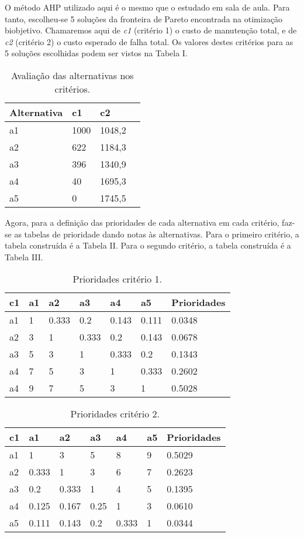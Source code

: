 O método AHP utilizado aqui é o mesmo que o estudado em sala de aula. Para tanto, escolheu-se 5 soluções da fronteira de Pareto encontrada na otimização biobjetivo. Chamaremos aqui de \textit{c1} (critério 1) o custo de manutenção total, e de \textit{c2} (critério 2) o custo esperado de falha total. Os valores destes critérios para as 5 soluções escolhidas podem ser vistos na Tabela I.
\begin{table}[h]
	\centering
	\begin{tabular}{ | l | l | l | l |}
		\hline
		Alternativa & c1 & c2 \\ \hline
		a1 & 1000 & 1048,2 \\ \hline
		a2 & 622 & 1184,3 \\ \hline
		a3 & 396 & 1340,9 \\ \hline
		a4 & 40 & 1695,3 \\ \hline
		a5 & 0 & 1745,5 \\ \hline
	\end{tabular}
	\label{table:c-ahp}
	\caption{Avaliação das alternativas nos critérios.}
\end{table}

Agora, para a definição das prioridades de cada alternativa em cada critério, faz-se as tabelas de prioridade dando notas às alternativas. Para o primeiro critério, a tabela construída é a Tabela II. Para o segundo critério, a tabela construída é a Tabela III.
\begin{table}[h]
	\centering
	\begin{tabular}{ | l | l | l | l | l | l | l | }
		\hline
		c1 & a1 & a2 & a3 & a4 & a5 & Prioridades \\ \hline
		a1 & 1 & 0.333 & 0.2 & 0.143 & 0.111 & 0.0348 \\ \hline
		a2 & 3 & 1 & 0.333 & 0.2 & 0.143 & 0.0678 \\ \hline
		a3 & 5 & 3 & 1 & 0.333 & 0.2 & 0.1343 \\ \hline
		a4 & 7 & 5 & 3 & 1 & 0.333 & 0.2602 \\ \hline
		a4 & 9 & 7 & 5 & 3 & 1 & 0.5028 \\ \hline
	\end{tabular}
	\label{table:c1}
	\caption{Prioridades critério 1.}
\end{table}

\begin{table}[h]
	\centering
	\begin{tabular}{ | l | l | l | l | l | l | l | }
		\hline
		c1 & a1 & a2 & a3 & a4 & a5 & Prioridades \\ \hline
		a1 & 1 & 3 & 5 & 8 & 9 & 0.5029 \\ \hline
		a2 & 0.333 & 1 & 3 & 6 & 7 & 0.2623 \\ \hline
		a3 & 0.2 & 0.333 & 1 & 4 & 5 & 0.1395 \\ \hline
		a4 & 0.125 & 0.167 & 0.25 & 1 & 3 & 0.0610 \\ \hline
		a5 & 0.111 & 0.143 & 0.2 & 0.333 & 1 & 0.0344 \\ \hline
	\end{tabular}
	\label{table:c2}
	\caption{Prioridades critério 2.}
\end{table}

